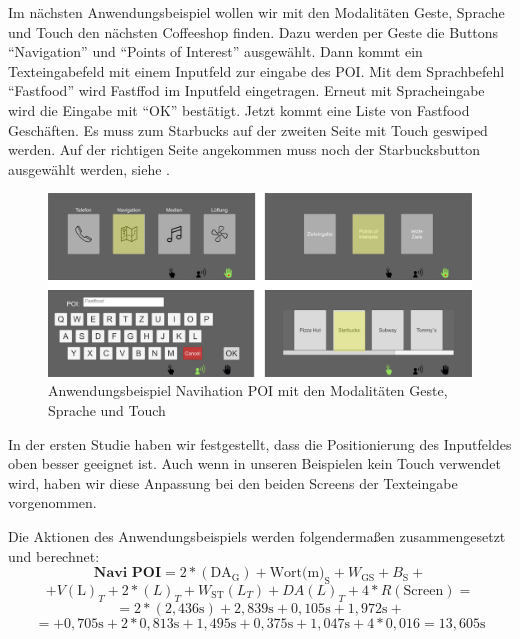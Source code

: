 Im nächsten Anwendungsbeispiel wollen wir mit den Modalitäten Geste, Sprache und Touch den nächsten Coffeeshop finden. Dazu werden per Geste die Buttons "`Navigation"' und "`Points of Interest"' ausgewählt. Dann kommt ein Texteingabefeld mit einem Inputfeld zur eingabe des POI. Mit dem Sprachbefehl "`Fastfood"' wird Fastffod im Inputfeld eingetragen. Erneut mit Spracheingabe wird die Eingabe mit "`OK"' bestätigt. Jetzt kommt eine Liste von Fastfood Geschäften. Es muss zum Starbucks auf der zweiten Seite mit Touch geswiped werden. Auf der richtigen Seite angekommen muss noch der Starbucksbutton ausgewählt werden, siehe .  
\begin{figure}
	\centering
		\includegraphics[width=1\textwidth]{img/UseCases_Eval_Navi_POI.jpg}
	\caption{Anwendungsbeispiel Navihation POI mit den Modalitäten Geste, Sprache und Touch}
	\label{fig:UseCasesEvalNaviPOI}
\end{figure}

In der ersten Studie haben wir festgestellt, dass die Positionierung des Inputfeldes oben besser geeignet ist. Auch wenn in unseren Beispielen kein Touch verwendet wird, haben wir diese Anpassung bei den beiden Screens der Texteingabe vorgenommen.

Die Aktionen des Anwendungsbeispiels werden folgendermaßen zusammengesetzt und berechnet:
\[	
\textbf{Navi POI} = 2*(\text{DA}_\text{G}) + \text{Wort(m)}_\text{S} + W_\text{GS} + B_\text{S} + 
\]
\[	
+ V(\text{L})_T + 2*(L)_T + W_\text{ST}(L_T) + DA(L)_T + 4*R(\text{Screen}) =
\]
\[
= 2*( 2,436\text{s}) + 2,839\text{s} + 0,105\text{s} + 1,972\text{s} + 
\]
\[
= + 0,705\text{s} + 2*0,813\text{s} + 1,495\text{s} + 0,375\text{s} + 1,047\text{s} + 4*0,016= 13,605\text{s}
\]

